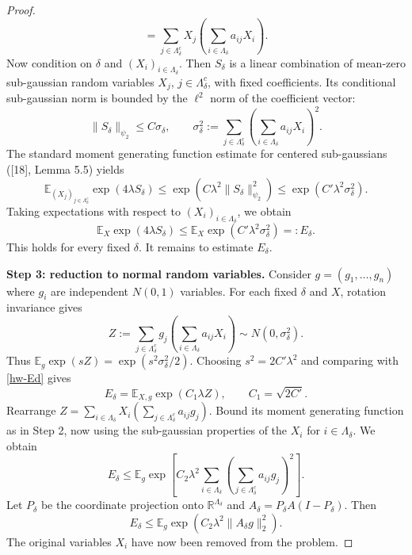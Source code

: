 \begin{proof}
\[=\sum_{j\in\Lambda_\delta^c}X_j\left(\sum_{i\in\Lambda_\delta}a_{ij}X_i\right).
\]
Now condition on $\delta$ and $(X_i)_{i\in\Lambda_\delta}$. Then $S_\delta$
is a linear combination of mean-zero sub-gaussian random variables
$X_j$, $j\in\Lambda_\delta^c$, with fixed coefficients. Its conditional
sub-gaussian norm is bounded by the $\ell^2$ norm of the coefficient vector:
\[
\|S_\delta\|_{\psi_2}\leq C\sigma_\delta,\qquad
\sigma_\delta^2:=\sum_{j\in\Lambda_\delta^c}
\left(\sum_{i\in\Lambda_\delta}a_{ij}X_i\right)^2.
\]
The standard moment generating function estimate for centered sub-gaussians
([18], Lemma 5.5) yields
\[
\mathbb E_{(X_j)_{j\in\Lambda_\delta^c}}\exp(4\lambda S_\delta)
\leq\exp(C\lambda^2\|S_\delta\|_{\psi_2}^2)
\leq\exp(C'\lambda^2\sigma_\delta^2).
\]
Taking expectations with respect to $(X_i)_{i\in\Lambda_\delta}$, we obtain
\begin{equation}\label{hw-Ed}
\mathbb E_X\exp(4\lambda S_\delta)
\leq\mathbb E_X\exp(C'\lambda^2\sigma_\delta^2)=:E_\delta.
\end{equation}
This holds for every fixed $\delta$. It remains to estimate $E_\delta$.

\textbf{Step 3: reduction to normal random variables.}
Consider $g=(g_1,\ldots,g_n)$ where $g_i$ are independent $N(0,1)$ variables.
For each fixed $\delta$ and $X$, rotation invariance gives
\[
Z:=\sum_{j\in\Lambda_\delta^c}g_j
\left(\sum_{i\in\Lambda_\delta}a_{ij}X_i\right)
\sim N(0,\sigma_\delta^2).
\]
Thus $\mathbb E_g\exp(sZ)=\exp(s^2\sigma_\delta^2/2)$.
Choosing $s^2=2C'\lambda^2$ and comparing with \eqref{hw-Ed} gives
\[
E_\delta=\mathbb E_{X,g}\exp(C_1\lambda Z),\qquad C_1=\sqrt{2C'}.
\]
Rearrange $Z=\sum_{i\in\Lambda_\delta}X_i
(\sum_{j\in\Lambda_\delta^c}a_{ij}g_j)$.
Bound its moment generating function as in Step 2, now using the
sub-gaussian properties of the $X_i$ for $i\in\Lambda_\delta$. We obtain
\[
E_\delta\leq\mathbb E_g\exp\left[C_2\lambda^2
\sum_{i\in\Lambda_\delta}\left(\sum_{j\in\Lambda_\delta^c}a_{ij}g_j\right)^2\right].
\]
Let $P_\delta$ be the coordinate projection onto $\mathbb R^{\Lambda_\delta}$
and $A_\delta=P_\delta A(I-P_\delta)$. Then
\[
E_\delta\leq\mathbb E_g\exp(C_2\lambda^2\|A_\delta g\|_2^2).
\]
The original variables $X_i$ have now been removed from the problem.


\end{proof}
